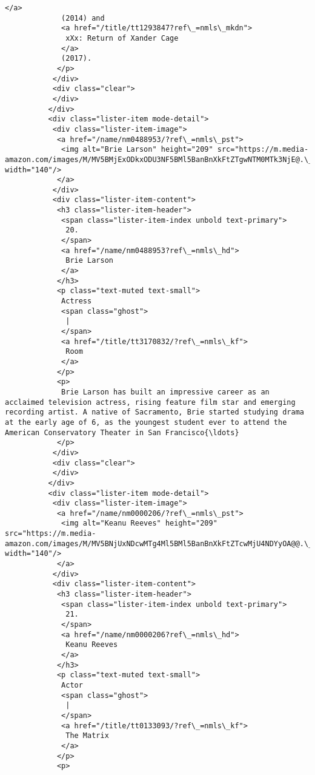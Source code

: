 \documentclass[11pt]{article}
\begin{document}
\begin{Verbatim}[commandchars=\\\{\}]
             </a>
             (2014) and
             <a href="/title/tt1293847?ref\_=nmls\_mkdn">
              xXx: Return of Xander Cage
             </a>
             (2017).
            </p>
           </div>
           <div class="clear">
           </div>
          </div>
          <div class="lister-item mode-detail">
           <div class="lister-item-image">
            <a href="/name/nm0488953/?ref\_=nmls\_pst">
             <img alt="Brie Larson" height="209" src="https://m.media-amazon.com/images/M/MV5BMjExODkxODU3NF5BMl5BanBnXkFtZTgwNTM0MTk3NjE@.\_V1\_UY209\_CR5,0,140,209\_AL\_.jpg" width="140"/>
            </a>
           </div>
           <div class="lister-item-content">
            <h3 class="lister-item-header">
             <span class="lister-item-index unbold text-primary">
              20.
             </span>
             <a href="/name/nm0488953?ref\_=nmls\_hd">
              Brie Larson
             </a>
            </h3>
            <p class="text-muted text-small">
             Actress
             <span class="ghost">
              |
             </span>
             <a href="/title/tt3170832/?ref\_=nmls\_kf">
              Room
             </a>
            </p>
            <p>
             Brie Larson has built an impressive career as an acclaimed television actress, rising feature film star and emerging recording artist. A native of Sacramento, Brie started studying drama at the early age of 6, as the youngest student ever to attend the American Conservatory Theater in San Francisco{\ldots}
            </p>
           </div>
           <div class="clear">
           </div>
          </div>
          <div class="lister-item mode-detail">
           <div class="lister-item-image">
            <a href="/name/nm0000206/?ref\_=nmls\_pst">
             <img alt="Keanu Reeves" height="209" src="https://m.media-amazon.com/images/M/MV5BNjUxNDcwMTg4Ml5BMl5BanBnXkFtZTcwMjU4NDYyOA@@.\_V1\_UY209\_CR10,0,140,209\_AL\_.jpg" width="140"/>
            </a>
           </div>
           <div class="lister-item-content">
            <h3 class="lister-item-header">
             <span class="lister-item-index unbold text-primary">
              21.
             </span>
             <a href="/name/nm0000206?ref\_=nmls\_hd">
              Keanu Reeves
             </a>
            </h3>
            <p class="text-muted text-small">
             Actor
             <span class="ghost">
              |
             </span>
             <a href="/title/tt0133093/?ref\_=nmls\_kf">
              The Matrix
             </a>
            </p>
            <p>

\end{Verbatim}
\end{document}
